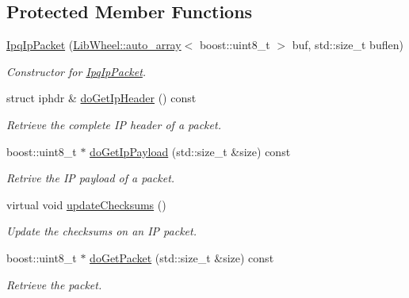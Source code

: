 \subsection*{\-Protected \-Member \-Functions}
\begin{DoxyCompactItemize}
\item 
\hyperlink{classIPQ_1_1IpqIpPacket_a1517b15b34742a3c2469ba7c5ed5ed01}{\-Ipq\-Ip\-Packet} (\hyperlink{classLibWheel_1_1auto__array}{\-Lib\-Wheel\-::auto\-\_\-array}$<$ boost\-::uint8\-\_\-t $>$ buf, std\-::size\-\_\-t buflen)
\begin{DoxyCompactList}\small\item\em \-Constructor for \hyperlink{classIPQ_1_1IpqIpPacket}{\-Ipq\-Ip\-Packet}. \end{DoxyCompactList}\item 
struct iphdr \& \hyperlink{classIPQ_1_1IpqIpPacket_a6be0afa1f616cbe7722ef817a65e24dc}{do\-Get\-Ip\-Header} () const 
\begin{DoxyCompactList}\small\item\em \-Retrieve the complete \-I\-P header of a packet. \end{DoxyCompactList}\item 
boost\-::uint8\-\_\-t $\ast$ \hyperlink{classIPQ_1_1IpqIpPacket_ab78709e0712a1912d19114f815407303}{do\-Get\-Ip\-Payload} (std\-::size\-\_\-t \&size) const 
\begin{DoxyCompactList}\small\item\em \-Retrive the \-I\-P payload of a packet. \end{DoxyCompactList}\item 
virtual void \hyperlink{classIPQ_1_1IpqIpPacket_a4c2c0ccd36ef921f6632b26ebd524b90}{update\-Checksums} ()
\begin{DoxyCompactList}\small\item\em \-Update the checksums on an \-I\-P packet. \end{DoxyCompactList}\item 
boost\-::uint8\-\_\-t $\ast$ \hyperlink{classIPQ_1_1IpqPacket_a7b8f489a9cec36058eaee43f6566a999}{do\-Get\-Packet} (std\-::size\-\_\-t \&size) const 
\begin{DoxyCompactList}\small\item\em \-Retrieve the packet. \end{DoxyCompactList}\end{DoxyCompactItemize}
